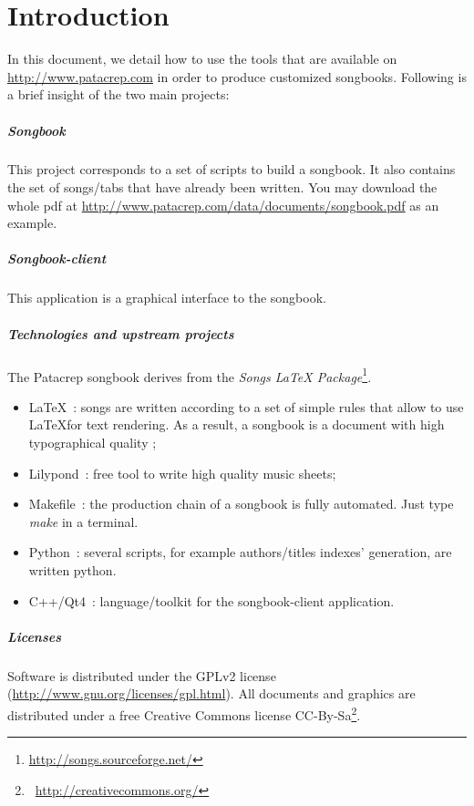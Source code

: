\chapter*{Introduction}
\minitoc
\label{chap:introduction}

In this document, we detail how to use the tools that are available on
\url{http://www.patacrep.com} in order to produce customized
songbooks. Following is a brief insight of the two main projects:

\paragraph{Songbook}
This project corresponds to a set of scripts to build a songbook.  It
also contains the set of songs/tabs that have already been written.
You may download the whole pdf at
\url{http://www.patacrep.com/data/documents/songbook.pdf} as an
example.

\paragraph{Songbook-client} 
This application is a graphical interface to the songbook.

\paragraph{Technologies and upstream projects} 
The Patacrep songbook derives from the \emph{Songs LaTeX
  Package}\footnote{\url{http://songs.sourceforge.net/}}.

\begin{itemize}
\item \LaTeX~: songs are written according to a set of simple rules
  that allow to use \LaTeX for text rendering. As a result, a songbook
  is a document with high typographical quality ;
\item Lilypond~: free tool to write high quality music sheets;
\item Makefile~: the production chain of a songbook is fully
  automated. Just type \emph{make} in a terminal.
\item Python~: several scripts, for example authors/titles indexes'
  generation, are written python.
\item C++/Qt4~: language/toolkit for the songbook-client application.
\end{itemize}

\paragraph{Licenses}
Software is distributed under the GPLv2 license
(\url{http://www.gnu.org/licenses/gpl.html}). All documents and
graphics are distributed under a free Creative Commons license
CC-By-Sa\footnote{\bysa~\url{http://creativecommons.org/}}.
